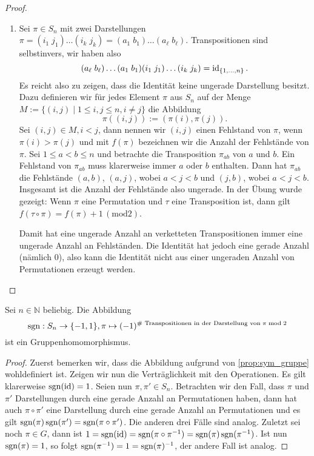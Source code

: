 \begin{proof}{\ }
\begin{enumerate}
        \item Sei $\pi \in S_n$ mit zwei Darstellungen $\pi = (i_1\; j_1) \hdots (i_k\; j_k) = (a_1\; b_1) \hdots (a_\ell\; b_\ell)$. Transpositionen sind selbstinvers, wir haben also
        $$ (a_\ell\; b_\ell) \hdots (a_1\; b_1) (i_1\; j_1) \hdots (i_k\; j_k) = \operatorname{id}_{\{1,\hdots,n\}}. $$
        Es reicht also zu zeigen, dass die Identität keine ungerade Darstellung besitzt. Dazu definieren wir für jedes Element $\pi$ aus $S_n$ auf der Menge $M := \{ (i, j) \mid 1 \leq i, j \leq n, i \neq j \}$ die Abbildung
        $$ \pi((i, j)) := (\pi(i), \pi(j)). $$
        Sei $(i, j) \in M, i < j$, dann nennen wir $(i,j)$ einen Fehlstand von $\pi$, wenn $\pi(i) > \pi(j)$ und mit $f(\pi)$ bezeichnen wir die Anzahl der Fehlstände von $\pi$. Sei $1 \leq a < b \leq n$ und betrachte die Transposition $\pi_{ab}$ von $a$ und $b$. Ein Fehlstand von $\pi_{ab}$ muss klarerweise immer $a$ oder $b$ enthalten. Dann hat $\pi_{ab}$ die Fehlstände $(a, b)$, $(a, j)$, wobei $a < j < b$ und $(j, b)$, wobei $a < j < b$. Insgesamt ist die Anzahl der Fehlstände also ungerade. In der Übung wurde gezeigt: Wenn $\pi$ eine Permutation und $\tau$ eine Transposition ist, dann gilt $f(\tau\circ\pi)=f(\pi)+1\,(\mathrm{mod } 2)$.
        
        Damit hat eine ungerade Anzahl an verketteten Transpositionen immer eine ungerade Anzahl an Fehlständen. Die Identität hat jedoch eine gerade Anzahl (nämlich 0), also kann die Identität nicht aus einer ungeraden Anzahl von Permutationen erzeugt werden.
    \end{enumerate}
\end{proof}

\begin{corollary}
    Sei $n\in\mathbb{N}$ beliebig. Die Abbildung $$\operatorname{sgn}: S_n \to \{-1,1\}, \pi \mapsto (-1)^{\text{\# Transpositionen in der Darstellung von}\;\pi\;\text{mod}\; 2}$$ ist ein Gruppenhomomorphismus.
\end{corollary}
\begin{proof}
    Zuerst bemerken wir, dass die Abbildung aufgrund von \cref{prop:sym_gruppe} wohldefiniert ist. Zeigen wir nun die Verträglichkeit mit den Operationen. Es gilt klarerweise $\operatorname{sgn}(\operatorname{id}) = 1$. Seien nun $\pi, \pi' \in S_n$. Betrachten wir den Fall, dass $\pi$ und $\pi'$ Darstellungen durch eine gerade Anzahl an Permutationen haben, dann hat auch $\pi \circ \pi'$ eine Darstellung durch eine gerade Anzahl an Permutationen und es gilt $\operatorname{sgn}(\pi)\operatorname{sgn}(\pi') = \operatorname{sgn}(\pi \circ \pi')$. Die anderen drei Fälle sind analog. Zuletzt sei noch $\pi \in G$, dann ist $1 = \operatorname{sgn}(\operatorname{id}) = \operatorname{sgn}(\pi \circ \pi^{-1}) = \operatorname{sgn}(\pi) \operatorname{sgn}(\pi^{-1})$. Ist nun $\operatorname{sgn}(\pi) = 1$, so folgt $\operatorname{sgn}(\pi^{-1}) = 1 = \operatorname{sgn}(\pi)^{-1}$, der andere Fall ist analog.
\end{proof}

